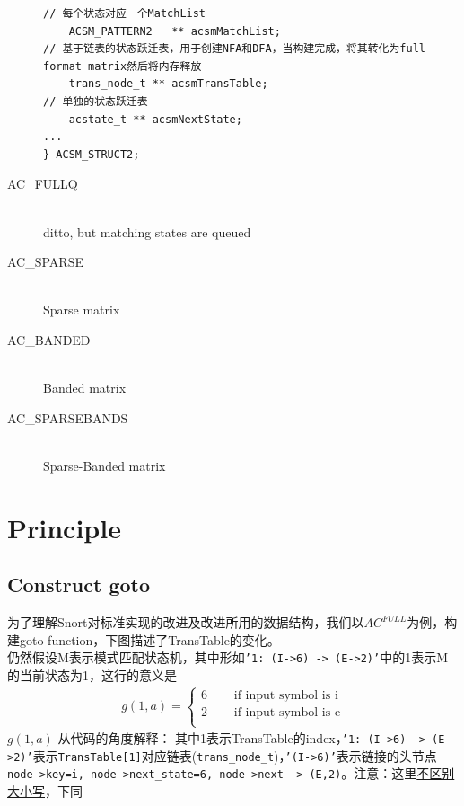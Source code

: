 \documentclass{article}
\begin{document}
\begin{description}
\begin{lstlisting}
// 每个状态对应一个MatchList
    ACSM_PATTERN2   ** acsmMatchList;
// 基于链表的状态跃迁表，用于创建NFA和DFA，当构建完成，将其转化为full format matrix然后将内存释放
    trans_node_t ** acsmTransTable;
// 单独的状态跃迁表
    acstate_t ** acsmNextState;
...
} ACSM_STRUCT2;
\end{lstlisting}
\item[AC\_FULLQ] \hfill \\
  ditto, but matching states are queued
\item[AC\_SPARSE] \hfill \\
  Sparse matrix
\item[AC\_BANDED] \hfill \\
  Banded matrix
\item[AC\_SPARSEBANDS] \hfill \\
  Sparse-Banded matrix
\end{description}

\section{Principle}

\subsection{Construct goto}
为了理解Snort对标准实现的改进及改进所用的数据结构，我们以$AC^{FULL}$为例，构建goto function，下图描述了TransTable的变化。\\
仍然假设M表示模式匹配状态机，其中形如\texttt{'1: (I->6) -> (E->2)'}中的1表示M的当前状态为1，这行的意义是
\begin{align*}
g(1,a) =
\begin{cases}
6 & \quad \text{ if input symbol is i}\\
2 & \quad \text{ if input symbol is e}\\
\end{cases}
\end{align*}
 $g(1,a) $
从代码的角度解释：
其中1表示TransTable的index，\texttt{'1: (I->6) -> (E->2)'}表示\lstinline$TransTable[1]$对应链表(\lstinline$trans_node_t$)，\texttt{'(I->6)'}表示链接的头节点\lstinline$node->key=i, node->next_state=6, node->next -> (E,2)$。注意：这里\underline{不区别大小写}，下同
\end{document}
